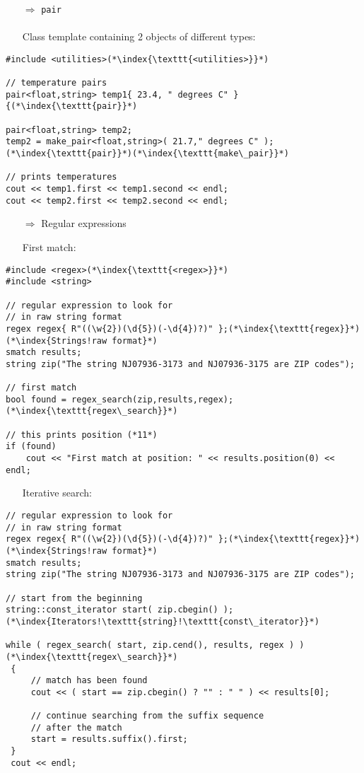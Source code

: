 \documentclass[10pt]{article}
\begin{document}
\begin{enumerate}
\item[$\Rightarrow$] \texttt{pair}\\ \\ Class template containing 2 objects of different types:
\end{enumerate}
\begin{lstlisting}
#include <utilities>(*\index{\texttt{<utilities>}}*)

// temperature pairs
pair<float,string> temp1{ 23.4, " degrees C" }{(*\index{\texttt{pair}}*)

pair<float,string> temp2; 
temp2 = make_pair<float,string>( 21.7," degrees C" );(*\index{\texttt{pair}}*)(*\index{\texttt{make\_pair}}*)

// prints temperatures
cout << temp1.first << temp1.second << endl;
cout << temp2.first << temp2.second << endl;
\end{lstlisting}
\begin{enumerate}
\item[$\Rightarrow$] Regular expressions
\end{enumerate}
\begin{enumerate}
\item[] First match:
\end{enumerate}
\begin{lstlisting}
#include <regex>(*\index{\texttt{<regex>}}*)
#include <string>

// regular expression to look for
// in raw string format 
regex regex{ R"((\w{2})(\d{5})(-\d{4})?)" };(*\index{\texttt{regex}}*)(*\index{Strings!raw format}*)
smatch results;
string zip("The string NJ07936-3173 and NJ07936-3175 are ZIP codes");

// first match
bool found = regex_search(zip,results,regex);(*\index{\texttt{regex\_search}}*)

// this prints position (*11*)
if (found)
    cout << "First match at position: " << results.position(0) << endl;
\end{lstlisting}
\begin{enumerate}
\item[] Iterative search:
\end{enumerate}
\begin{lstlisting}
// regular expression to look for
// in raw string format 
regex regex{ R"((\w{2})(\d{5})(-\d{4})?)" };(*\index{\texttt{regex}}*)(*\index{Strings!raw format}*)
smatch results;
string zip("The string NJ07936-3173 and NJ07936-3175 are ZIP codes");

// start from the beginning
string::const_iterator start( zip.cbegin() );(*\index{Iterators!\texttt{string}!\texttt{const\_iterator}}*)

while ( regex_search( start, zip.cend(), results, regex ) )(*\index{\texttt{regex\_search}}*)
 {
     // match has been found
     cout << ( start == zip.cbegin() ? "" : " " ) << results[0];
     
     // continue searching from the suffix sequence
     // after the match
     start = results.suffix().first;
 }
 cout << endl;
\end{lstlisting}
\end{document}
